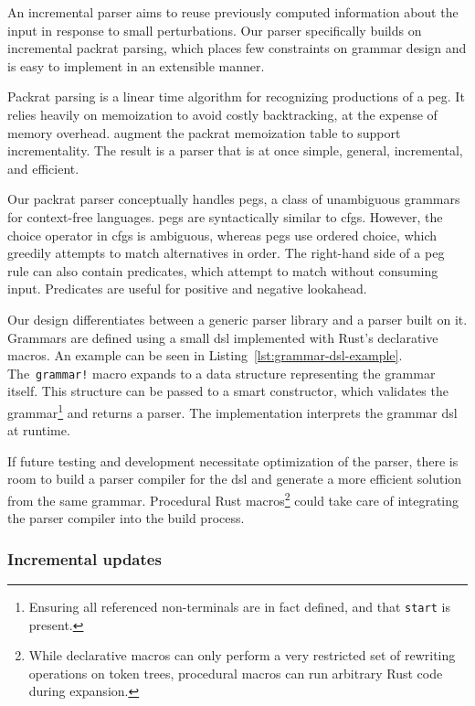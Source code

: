 An incremental parser aims to reuse previously computed information about the
input in response to small perturbations. Our parser specifically builds on
incremental packrat parsing\cite{dubroy2017incremental_packrat_parsing}, which
places few constraints on grammar design and is easy to implement in an
extensible manner.

Packrat parsing\cite{ford2002packrat} is a linear time algorithm for recognizing
productions of a \acrfull{peg}. It relies heavily on memoization to avoid costly
backtracking, at the expense of memory overhead.
\citeauthor{dubroy2017incremental_packrat_parsing} augment the packrat
memoization table to support incrementality. The result is a parser that is at
once simple, general, incremental, and efficient.

Our packrat parser conceptually handles \acrlong{peg}s\cite{ford2004parsing}, a
class of unambiguous grammars for context-free languages. \acrshort{peg}s are
syntactically similar to \acrlong{cfg}s. However, the choice operator in
\acrshort{cfg}s is ambiguous, whereas \acrshort{peg}s use ordered choice, which
greedily attempts to match alternatives in order. The right-hand side of a
\acrlong{peg} rule can also contain predicates, which attempt to match without
consuming input. Predicates are useful for positive and negative look\-ahead.

Our design differentiates between a generic parser library and a parser built on
it. Grammars are defined using a small \acrshort{dsl} implemented with Rust's
declarative macros. An example can be seen in
Listing~\ref{lst:grammar-dsl-example}. The~\texttt{grammar!} macro expands to a
data structure representing the grammar itself. This structure can be passed to
a smart constructor, which validates the grammar\footnote{Ensuring all
referenced non-terminals are in fact defined, and that \texttt{start} is
present.} and returns a parser. The implementation interprets the grammar
\acrshort{dsl} at runtime.

If future testing and development necessitate optimization of the parser, there
is room to build a parser compiler for the \acrshort{dsl} and generate a more
efficient solution from the same grammar. Procedural Rust macros\footnote{While
declarative macros can only perform a very restricted set of rewriting
operations on token trees, procedural macros can run arbitrary Rust code during
expansion.} could take care of integrating the parser compiler into the build
process.

\subsubsection*{Incremental updates}

